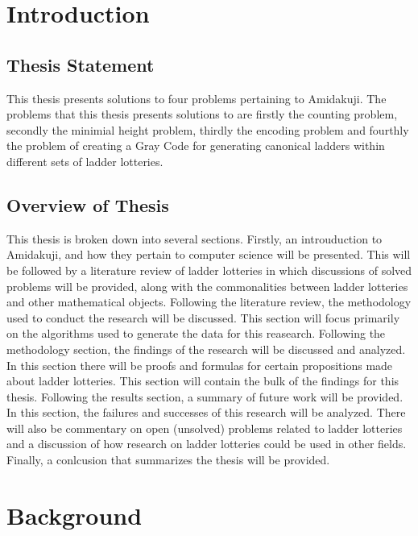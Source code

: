 



\chapter{Introduction}
\label{chapter:intro}



\section{Thesis Statement}  
This thesis presents solutions to four problems pertaining to Amidakuji.
The problems that this thesis presents solutions to are firstly the counting problem, secondly the minimial height problem,
thirdly the encoding problem and fourthly the problem of creating a Gray Code for generating canonical ladders within different sets
of ladder lotteries. 
\section{Overview of Thesis}  

This thesis is broken down into several sections. Firstly, an introuduction to Amidakuji, 
and how they pertain to computer science will be presented. This will be followed by a literature 
review of ladder lotteries in which discussions of solved problems will be 
provided, along with the commonalities between ladder lotteries and 
other mathematical objects. Following the literature review, the methodology
used to conduct the research will be discussed. This section will focus 
primarily on the algorithms used to generate the data for this reasearch. 
Following the methodology section, the findings of the research will be discussed and analyzed. 
In this section there will be proofs and formulas for certain propositions made about ladder 
lotteries. This section will contain the bulk of the findings for this thesis.
Following the results section, a summary of future work will be provided. In this section,
the failures and successes of this research will be analyzed. There will also be commentary on 
open (unsolved) problems related to ladder lotteries and a 
discussion of how research on ladder lotteries could be used in other fields.
Finally, a conlcusion that summarizes the thesis will be provided.

\chapter{Background}
\label{chapter:background}
 


